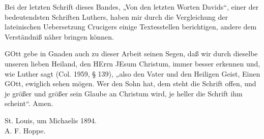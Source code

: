 Bei der letzten Schrift dieses Bandes, „Von den letzten Worten Davids“, einer
der bedeutendsten Schriften Luthers, haben mir durch die Vergleichung der lateinischen Uebersetzung Crucigers einige Textesstellen berichtigen, andere dem Verständniß näher bringen können.

GOtt gebe in Gnaden auch zu dieser Arbeit seinen Segen, daß wir durch dieselbe unseren lieben Heiland, den HErrn JEsum Christum, immer besser erkennen und, wie Luther sagt (Col. 1959, § 139), „also den Vater und den Heiligen Geist, Einen GOtt, ewiglich sehen mögen. Wer den Sohn hat, dem steht die Schrift offen, und je größer und größer sein Glaube an Christum wird, je heller die Schrift ihm scheint“. Amen.

\begin{unterschrift}
St. Louis, um Michaelis 1894.\\
A. F. Hoppe.
\end{unterschrift}
